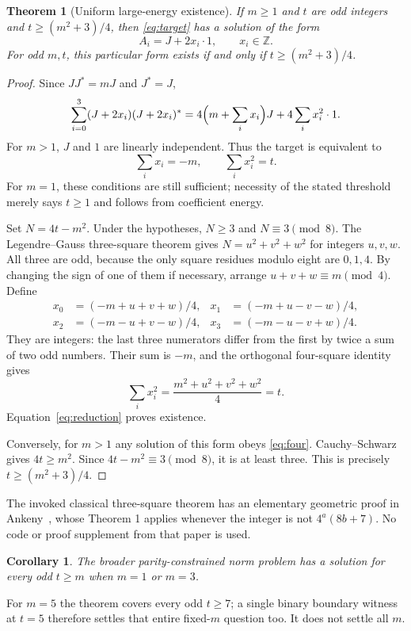 \documentclass[11pt]{article}
\newtheorem{theorem}[proposition]{Theorem}
\newtheorem{corollary}[proposition]{Corollary}
\newcommand{\Z}{\mathbb Z}
\begin{document}
\begin{theorem}[Uniform large-energy existence]\label{thm:main}
If $m\ge1$ and $t$ are odd integers and $t\ge(m^2+3)/4$, then
\eqref{eq:target} has a solution of the form
\[
 A_i=J+2x_i\cdot1,\qquad x_i\in\Z.
\]
For odd $m,t$, this particular form exists if and only if
$t\ge(m^2+3)/4$.
\end{theorem}
\begin{proof}
Since $JJ^*=mJ$ and $J^*=J$,
\begin{equation}\label{eq:reduction}
 \sum_{i=0}^3(J+2x_i)(J+2x_i)^*
 =4\Bigl(m+\sum_i x_i\Bigr)J+4\sum_i x_i^2\cdot1.
\end{equation}
For $m>1$, $J$ and $1$ are linearly independent. Thus the target is
equivalent to
\begin{equation}\label{eq:four}
 \sum_i x_i=-m,\qquad \sum_i x_i^2=t.
\end{equation}
For $m=1$, these conditions are still sufficient; necessity of the
stated threshold merely says $t\ge1$ and follows from coefficient energy.

Set $N=4t-m^2$. Under the hypotheses, $N\ge3$ and $N\equiv3\pmod8$.
The Legendre--Gauss three-square theorem gives
$N=u^2+v^2+w^2$ for integers $u,v,w$. All three are odd, because the
only square residues modulo eight are $0,1,4$. By changing the sign of
one of them if necessary, arrange
$u+v+w\equiv m\pmod4$. Define
\begin{align*}
 x_0&=(-m+u+v+w)/4,& x_1&=(-m+u-v-w)/4,\\
 x_2&=(-m-u+v-w)/4,& x_3&=(-m-u-v+w)/4.
\end{align*}
They are integers: the last three numerators differ from the first by
twice a sum of two odd numbers. Their sum is $-m$, and the orthogonal
four-square identity gives
\[
 \sum_i x_i^2=\frac{m^2+u^2+v^2+w^2}{4}=t.
\]
Equation~\eqref{eq:reduction} proves existence.

Conversely, for $m>1$ any solution of this form obeys
\eqref{eq:four}. Cauchy--Schwarz gives $4t\ge m^2$. Since
$4t-m^2\equiv3\pmod8$, it is at least three. This is precisely
$t\ge(m^2+3)/4$.
\end{proof}

The invoked classical three-square theorem has an elementary geometric
proof in Ankeny~\cite{Ankeny}, whose Theorem 1 applies whenever the
integer is not $4^a(8b+7)$. No code or proof supplement from that paper
is used.

\begin{corollary}
The broader parity-constrained norm problem has a solution for every
odd $t\ge m$ when $m=1$ or $m=3$.
\end{corollary}
For $m=5$ the theorem covers every odd $t\ge7$; a single binary boundary
witness at $t=5$ therefore settles that entire fixed-$m$ question too.
It does not settle all $m$.
\end{document}
